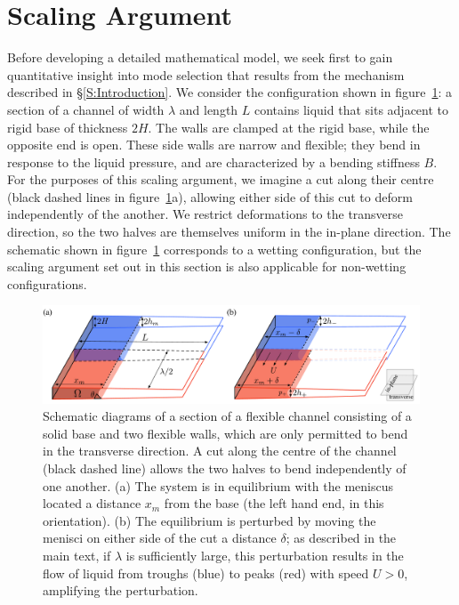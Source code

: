 \documentclass{jfm}
\begin{document}
\section{Scaling Argument}\label{S:Scaling}
Before developing a detailed mathematical model, we seek first to gain quantitative insight into mode selection that results from the mechanism described in \S\ref{S:Introduction}. We consider the configuration shown in figure~\ref{fig:Scaling:ScalingArgument}: a section of a channel of width $\lambda$ and length $L$ contains liquid that sits adjacent to rigid base of thickness $2H$. The walls are clamped at the rigid base, while the opposite end is open. These side walls are narrow and flexible; they bend in response to the liquid pressure, and are characterized by a bending stiffness $B$. For the purposes of this scaling argument, we imagine a cut along their centre (black dashed lines in figure~\ref{fig:Scaling:ScalingArgument}a), allowing either side of this cut to deform independently of the another. We restrict deformations to the transverse direction, so the two halves are themselves uniform in the in-plane direction. The schematic shown in figure~\ref{fig:Scaling:ScalingArgument} corresponds to a wetting configuration, but the scaling argument set out in this section is also applicable for non-wetting configurations.

\begin{figure}
\centering
\includegraphics[width = .99\textwidth]{figures/fig3_scaling_argument.pdf}
\caption{Schematic diagrams of a section of a flexible channel consisting of a solid base and two flexible walls, which are only permitted to bend in the transverse direction. A cut along the centre of the channel (black dashed line) allows the two halves to bend independently of one another. (a) The system is in equilibrium with the meniscus located a distance $x_m$ from the base (the left hand end, in this orientation).  (b) The equilibrium is perturbed by moving the menisci on either side of the cut a distance $\delta$; as described in the main text, if $\lambda$ is sufficiently large, this perturbation results in the flow of liquid from troughs (blue) to peaks (red) with speed $U > 0$, amplifying the perturbation.}
\label{fig:Scaling:ScalingArgument}
\end{figure}
\end{document}
